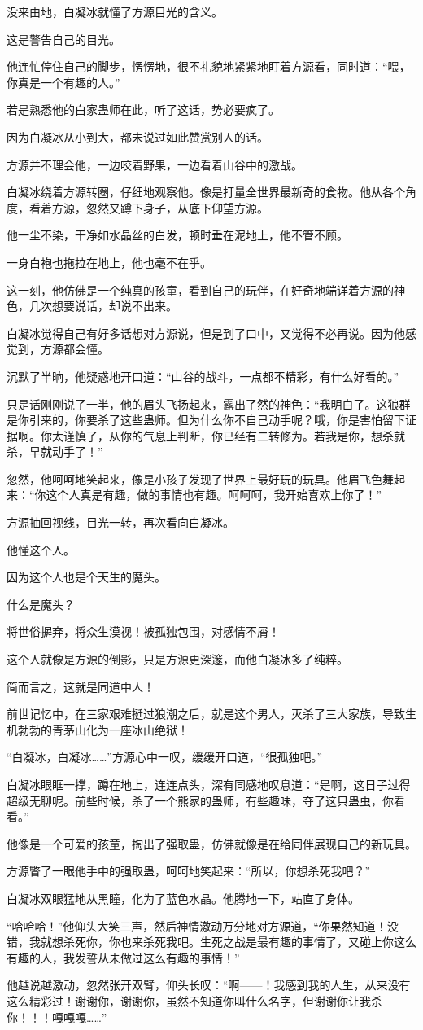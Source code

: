 \begin{this_body}
没来由地，白凝冰就懂了方源目光的含义。

这是警告自己的目光。

他连忙停住自己的脚步，愣愣地，很不礼貌地紧紧地盯着方源看，同时道：“喂，你真是一个有趣的人。”

若是熟悉他的白家蛊师在此，听了这话，势必要疯了。

因为白凝冰从小到大，都未说过如此赞赏别人的话。

方源并不理会他，一边咬着野果，一边看着山谷中的激战。

白凝冰绕着方源转圈，仔细地观察他。像是打量全世界最新奇的食物。他从各个角度，看着方源，忽然又蹲下身子，从底下仰望方源。

他一尘不染，干净如水晶丝的白发，顿时垂在泥地上，他不管不顾。

一身白袍也拖拉在地上，他也毫不在乎。

这一刻，他仿佛是一个纯真的孩童，看到自己的玩伴，在好奇地端详着方源的神色，几次想要说话，却说不出来。

白凝冰觉得自己有好多话想对方源说，但是到了口中，又觉得不必再说。因为他感觉到，方源都会懂。

沉默了半晌，他疑惑地开口道：“山谷的战斗，一点都不精彩，有什么好看的。”

只是话刚刚说了一半，他的眉头飞扬起来，露出了然的神色：“我明白了。这狼群是你引来的，你要杀了这些蛊师。但为什么你不自己动手呢？哦，你是害怕留下证据啊。你太谨慎了，从你的气息上判断，你已经有二转修为。若我是你，想杀就杀，早就动手了！”

忽然，他呵呵地笑起来，像是小孩子发现了世界上最好玩的玩具。他眉飞色舞起来：“你这个人真是有趣，做的事情也有趣。呵呵呵，我开始喜欢上你了！”

方源抽回视线，目光一转，再次看向白凝冰。

他懂这个人。

因为这个人也是个天生的魔头。

什么是魔头？

将世俗摒弃，将众生漠视！被孤独包围，对感情不屑！

这个人就像是方源的倒影，只是方源更深邃，而他白凝冰多了纯粹。

简而言之，这就是同道中人！

前世记忆中，在三家艰难挺过狼潮之后，就是这个男人，灭杀了三大家族，导致生机勃勃的青茅山化为一座冰山绝狱！

“白凝冰，白凝冰……”方源心中一叹，缓缓开口道，“很孤独吧。”

白凝冰眼眶一撑，蹲在地上，连连点头，深有同感地叹息道：“是啊，这日子过得超级无聊呢。前些时候，杀了一个熊家的蛊师，有些趣味，夺了这只蛊虫，你看看。”

他像是一个可爱的孩童，掏出了强取蛊，仿佛就像是在给同伴展现自己的新玩具。

方源瞥了一眼他手中的强取蛊，呵呵地笑起来：“所以，你想杀死我吧？”

白凝冰双眼猛地从黑瞳，化为了蓝色水晶。他腾地一下，站直了身体。

“哈哈哈！”他仰头大笑三声，然后神情激动万分地对方源道，“你果然知道！没错，我就想杀死你，你也来杀死我吧。生死之战是最有趣的事情了，又碰上你这么有趣的人，我发誓从未做过这么有趣的事情！”

他越说越激动，忽然张开双臂，仰头长叹：“啊——！我感到我的人生，从来没有这么精彩过！谢谢你，谢谢你，虽然不知道你叫什么名字，但谢谢你让我杀你！！！嘎嘎嘎……”

\end{this_body}

